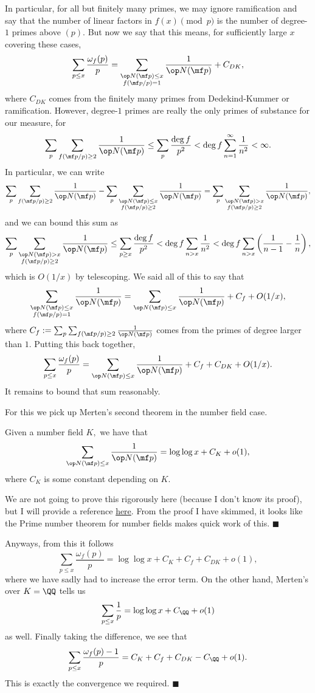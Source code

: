 In particular, for all but finitely many primes, we may ignore ramification and say that the number of linear factors in $f(x)\pmod p$ is the number of degree-$1$ primes above $(p).$ But now we say that this means, for sufficiently large $x$ covering these cases,
\[\sum_{p\le x}\frac{\omega_f(p)}p=\sum_{\substack{\op N(\mf p)\le x\\f(\mf p/p)=1}}\frac1{\op N(\mf p)}+C_{DK},\]
where $C_{DK}$ comes from the finitely many primes from Dedekind-Kummer or ramification. However, degree-$1$ primes are really the only primes of substance for our measure, for
\[\sum_p\sum_{f(\mf p/p)\ge2}\frac1{\op N(\mf p)}\le\sum_p\frac{\deg f}{p^2}<\deg f\sum_{n=1}^\infty\frac1{n^2}<\infty.\]
In particular, we can write
\[\sum_p\sum_{f(\mf p/p)\ge2}\frac1{\op N(\mf p)}-\sum_p\sum_{\substack{\op N(\mf p)\le x\\f(\mf p/p)\ge2}}\frac1{\op N(\mf p)}=\sum_p\sum_{\substack{\op N(\mf p)>x\\f(\mf p/p)\ge2}}\frac1{\op N(\mf p)},\]
and we can bound this sum as
\[\sum_p\sum_{\substack{\op N(\mf p)>x\\f(\mf p/p)\ge2}}\frac1{\op N(\mf p)}\le\sum_{p\ge x}\frac{\deg f}{p^2}<\deg f\sum_{n>x}\frac1{n^2}<\deg f\sum_{n>x}\left(\frac1{n-1}-\frac1n\right),\]
which is $O(1/x)$ by telescoping. We said all of this to say that
\[\sum_{\substack{\op N(\mf p)\le x\\f(\mf p/p)=1}}\frac1{\op N(\mf p)}=\sum_{\op N(\mf p)\le x}\frac1{\op N(\mf p)}+C_f+O(1/x),\]
where $C_f:=\sum_p\sum_{f(\mf p/p)\ge2}\frac1{\op N(\mf p)}$ comes from the primes of degree larger than $1.$ Putting this back together,
\[\sum_{p\le x}\frac{\omega_f(p)}p=\sum_{\op N(\mf p)\le x}\frac1{\op N(\mf p)}+C_f+C_{DK}+O(1/x).\]
It remains to bound that sum reasonably.

For this we pick up Merten's second theorem in the number field case.
\begin{lemma}
    Given a number field $K,$ we have that
    \[\sum_{\op N(\mf p)\le x}\frac1{\op N(\mf p)}=\log\log x+C_K+o(1),\]
    where $C_K$ is some constant depending on $K.$
\end{lemma}
We are not going to prove this rigorously here (because I don't know its proof), but I will provide a reference \href{https://arxiv.org/pdf/math/0703570.pdf}{here}. From the proof I have skimmed, it looks like the Prime number theorem for number fields makes quick work of this. $\blacksquare$

Anyways, from this it follows
\[\sum_{p\le x}\frac{\omega_f(p)}p=\log\log x+C_K+C_f+C_{DK}+o(1),\]
where we have sadly had to increase the error term. On the other hand, Merten's over $K=\QQ$ tells us
\[\sum_{p\le x}\frac1p=\log\log x+C_\QQ+o(1)\]
as well. Finally taking the difference, we see that
\[\sum_{p\le x}\frac{\omega_f(p)-1}p=C_K+C_f+C_{DK}-C_\QQ+o(1).\]
This is exactly the convergence we required. $\blacksquare$

